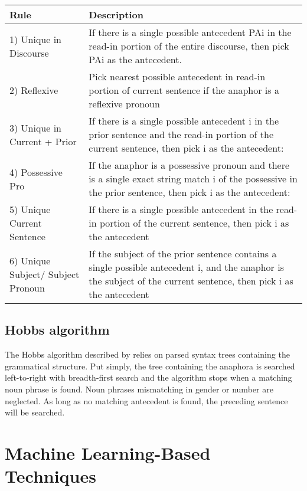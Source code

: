 \begin{center}
    \begin{tabular}{| l |p{8cm} |}

    \hline

    Rule & Description \\ \hline
\hline
    1) Unique in Discourse & If there is a single possible antecedent PAi in the read-in portion of the entire discourse, then pick PAi as the antecedent. \\ \hline
    2) Reflexive & Pick nearest possible antecedent in read-in portion of current sentence if the anaphor is a reflexive pronoun \\ \hline
    3) Unique in Current + Prior & If there is a single possible antecedent i in the prior sentence and the read-in portion of the current sentence, then pick i as the antecedent: \\ \hline
    4) Possessive Pro & If the anaphor is a possessive pronoun and there is a single exact string match i of the possessive in the prior sentence, then pick i as the antecedent:  \\ \hline
    5) Unique Current Sentence & If there is a single possible antecedent in the read-in portion of the current sentence, then pick i as the antecedent  \\ \hline
    6) Unique Subject/ Subject Pronoun & If the subject of the prior sentence contains a single possible antecedent i, and the anaphor is the subject of the current sentence, then pick i as the antecedent \\ \hline

    \end{tabular}
     \label{table:cogniacRules}
\end{center}

\subsection{Hobbs algorithm}
The Hobbs algorithm described by \citep{hobbs1978resolving} relies on parsed syntax trees containing the grammatical structure. Put simply, the tree containing the anaphora is searched left-to-right with breadth-first search and the algorithm stops when a matching noun phrase is found. Noun phrases mismatching in gender or number are neglected. As long as no matching antecedent is found, the preceding sentence will be searched.

\section{Machine Learning-Based Techniques}


